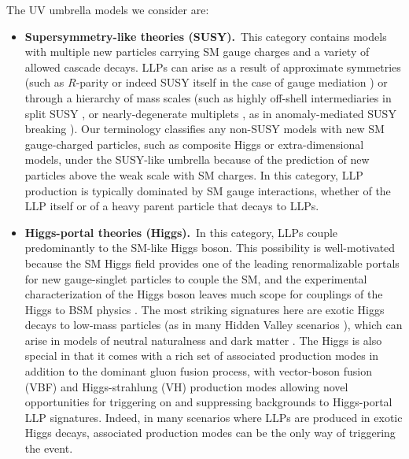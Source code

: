 The UV umbrella models we consider are:
%
\begin{itemize}

\item {\bf Supersymmetry-like theories (SUSY).}~This category contains models
  with multiple new particles carrying SM gauge charges and a variety
  of allowed cascade decays. LLPs can arise as a result of approximate
  symmetries (such as $R$-parity \cite{Barbier:2004ez} or indeed SUSY itself in the case
  of gauge mediation \cite{Dimopoulos:1996vz}) or through a hierarchy of mass scales (such as
  highly off-shell intermediaries in split SUSY \cite{ArkaniHamed:2004fb}, or
  nearly-degenerate multiplets \cite{Chen:1995yu,Thomas:1998wy,Byrne:2003sa}, as in anomaly-mediated SUSY breaking \cite{Feng:1999fu}).  Our terminology
  classifies any non-SUSY models with new SM gauge-charged particles, such
  as composite Higgs or extra-dimensional models, under the SUSY-like
  umbrella because of the prediction of new particles above the weak scale with SM charges.  In this category, LLP production is typically dominated by
  SM gauge interactions, whether of the LLP itself or of a heavy
  parent particle that decays to LLPs.

\item {\bf Higgs-portal theories (Higgs).}~In this category, LLPs couple predominantly to the SM-like Higgs boson.  This possibility is well-motivated because the SM Higgs field provides one of the leading renormalizable portals for new gauge-singlet particles to couple the SM, and the experimental characterization of the Higgs boson leaves much scope for couplings of the Higgs to BSM physics \cite{Khachatryan:2014jba,Aad:2015pla}.  The most striking signatures here are exotic Higgs decays  to low-mass particles  \cite{Curtin:2013fra} (as in many Hidden Valley scenarios \cite{Strassler:2006im,Strassler:2006ri}), which can arise in models of neutral naturalness \cite{Chacko:2005pe,Burdman:2006tz,Craig:2015pha} and dark matter \cite{Silveira:1985rk}.  
The Higgs is also special in that it comes with a rich set of associated production modes in addition to the dominant gluon fusion process, with vector-boson fusion (VBF) and Higgs-strahlung (VH) production modes allowing novel opportunities for triggering on and suppressing backgrounds to Higgs-portal LLP signatures. Indeed, in many scenarios where LLPs are produced in exotic Higgs decays, associated production modes can be the only way of triggering the event.


\end{itemize}
